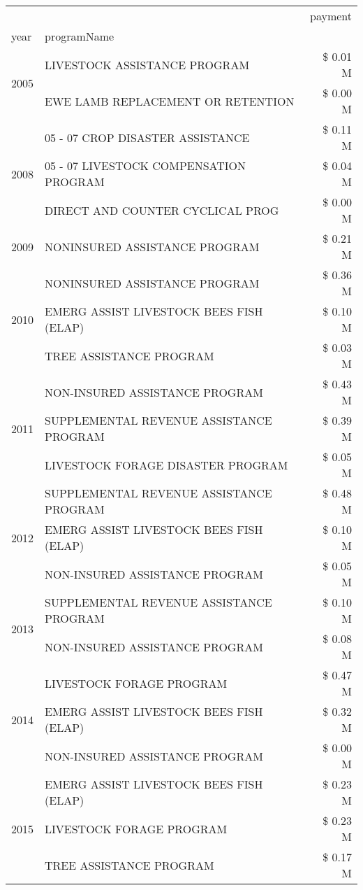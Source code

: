 \begin{tabular}{llr}
\toprule
 &  & payment \\
year & programName &  \\
\midrule
\multirow[t]{2}{*}{2005} & LIVESTOCK ASSISTANCE PROGRAM & \$ 0.01 M \\
 & EWE LAMB REPLACEMENT OR RETENTION & \$ 0.00 M \\
\cline{1-3}
\multirow[t]{3}{*}{2008} & 05 - 07 CROP DISASTER ASSISTANCE & \$ 0.11 M \\
 & 05 - 07 LIVESTOCK COMPENSATION PROGRAM & \$ 0.04 M \\
 & DIRECT AND COUNTER CYCLICAL PROG & \$ 0.00 M \\
\cline{1-3}
2009 & NONINSURED ASSISTANCE PROGRAM & \$ 0.21 M \\
\cline{1-3}
\multirow[t]{3}{*}{2010} & NONINSURED ASSISTANCE PROGRAM & \$ 0.36 M \\
 & EMERG ASSIST LIVESTOCK BEES FISH (ELAP) & \$ 0.10 M \\
 & TREE ASSISTANCE PROGRAM & \$ 0.03 M \\
\cline{1-3}
\multirow[t]{3}{*}{2011} & NON-INSURED ASSISTANCE PROGRAM & \$ 0.43 M \\
 & SUPPLEMENTAL REVENUE ASSISTANCE PROGRAM & \$ 0.39 M \\
 & LIVESTOCK FORAGE DISASTER PROGRAM & \$ 0.05 M \\
\cline{1-3}
\multirow[t]{3}{*}{2012} & SUPPLEMENTAL REVENUE ASSISTANCE PROGRAM & \$ 0.48 M \\
 & EMERG ASSIST LIVESTOCK BEES FISH (ELAP) & \$ 0.10 M \\
 & NON-INSURED ASSISTANCE PROGRAM & \$ 0.05 M \\
\cline{1-3}
\multirow[t]{2}{*}{2013} & SUPPLEMENTAL REVENUE ASSISTANCE PROGRAM & \$ 0.10 M \\
 & NON-INSURED ASSISTANCE PROGRAM & \$ 0.08 M \\
\cline{1-3}
\multirow[t]{3}{*}{2014} & LIVESTOCK FORAGE PROGRAM & \$ 0.47 M \\
 & EMERG ASSIST LIVESTOCK BEES FISH (ELAP) & \$ 0.32 M \\
 & NON-INSURED ASSISTANCE PROGRAM & \$ 0.00 M \\
\cline{1-3}
\multirow[t]{3}{*}{2015} & EMERG ASSIST LIVESTOCK BEES FISH (ELAP) & \$ 0.23 M \\
 & LIVESTOCK FORAGE PROGRAM & \$ 0.23 M \\
 & TREE ASSISTANCE PROGRAM & \$ 0.17 M \\
\cline{1-3}

\end{tabular}
